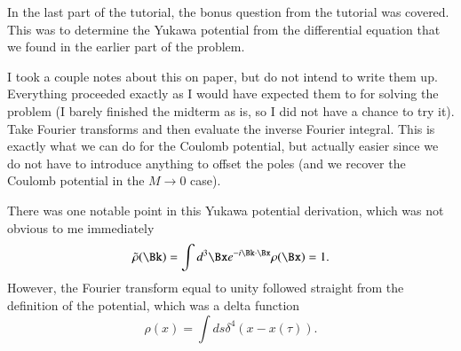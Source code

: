 %
%
%
%
In the last part of the tutorial, the bonus question from the tutorial was covered.  This was to determine the Yukawa potential from the differential equation that we found in the earlier part of the problem.

I took a couple notes about this on paper, but do not intend to write them up.  Everything proceeded exactly as I would have expected them to for solving the problem (I barely finished the midterm as is, so I did not have a chance to try it).  Take Fourier transforms and then evaluate the inverse Fourier integral.  This is exactly what we can do for the Coulomb potential, but actually easier since we do not have to introduce anything to offset the poles (and we recover the Coulomb potential in the \(M \rightarrow 0\) case).

There was one notable point in this Yukawa potential derivation, which was not obvious to me immediately
%
\begin{equation}\label{eqn:relativisticElectrodynamicsT8:350}
\tilde{\rho}(\Bk) = \int d^3 \Bx e^{-i \Bk \cdot \Bx} \rho(\Bx) = 1.
\end{equation}
%
However, the Fourier transform equal to unity followed straight from the definition of the potential, which was a delta function
%
\begin{equation}\label{eqn:relativisticElectrodynamicsT8:340}
\rho(x) = \int ds \delta^4(x - x(\tau)).
\end{equation}
